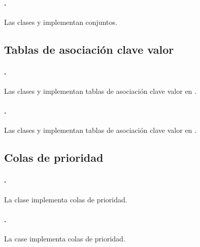 \paragraph{\java.} Las clases  y  implementan
  conjuntos.

\subsection{Tablas de asociación clave valor}
\label{tech-map}
\paragraph{\cpp.} Las clases  y  implementan tablas de
  asociación clave valor en \cpp.
\paragraph{\java.} Las clases  y  implementan tablas de
  asociación clave valor en \java.

\subsection{Colas de prioridad}
\label{tech-priority-queue}
\paragraph{\cpp.} La clase  implementa colas de prioridad.
\paragraph{\java.} La case  implementa colas de prioridad.

